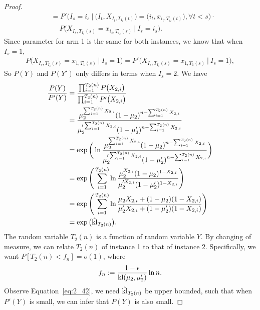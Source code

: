 \begin{proof}
\begin{equation}
\begin{split}
            &=P'\Big(I_s=i_s~\Big|~
            \big(I_t, X_{I_t, T_{I_t}(t)}\big)=\big(i_t, x_{i_t, T_{i_t}(t)}\big), \forall t<s\Big) \cdot \\
            &\quad~P\Big(X_{I_s, T_{I_s}(s)}=x_{i_s, T_{i_s}(s)}~\Big|~I_s=i_s\Big).
        \end{split}
    \end{equation}
    Since parameter for arm 1 is the same for both instances, we know that when $I_s=1$,
    \begin{align}
        P\Big(X_{I_s, T_{I_s}(s)}=x_{1, T_{1}(s)}~\Big|~I_s=1\Big) = P'\Big(X_{I_s, T_{I_s}(s)}=x_{1, T_{1}(s)}~\Big|~I_s=1\Big),
    \end{align}
    So $P(Y)$ and $P(Y')$ only differs in terms when $I_s=2$.
    We have
    \begin{align}
        \frac{P(Y)}{P'(Y)}
            &= \frac{\prod_{i=1}^{T_2(n)}P\big(X_{2, i}\big)}{\prod_{i=1}^{T_2(n)}P'\big(X_{2, i}\big)} \\
            &= \frac{\mu_2^{\sum_{i=1}^{T_2(n)} X_{2,i}}(1-\mu_2)^{n-\sum_{i=1}^{T_2(n)} X_{2,i}}}
                {\mu_2'^{\sum_{i=1}^{T_2(n)} X_{2,i}}(1-\mu_2')^{n-\sum_{i=1}^{T_2(n)} X_{2,i}}} \\
            &= \exp\bigg(\ln
                \frac{\mu_2^{\sum_{i=1}^{T_2(n)} X_{2,i}}(1-\mu_2)^{n-\sum_{i=1}^{T_2(n)} X_{2,i}}}
                {\mu_2'^{\sum_{i=1}^{T_2(n)} X_{2,i}}(1-\mu_2')^{n-\sum_{i=1}^{T_2(n)} X_{2,i}}}\bigg) \\
            &= \exp\Bigg(\sum_{i=1}^{T_2(n)} \ln
                \frac{\mu_2^{X_{2,i}}(1-\mu_2)^{1-X_{2,i}}}
                {\mu_2'^{X_{2,i}}(1-\mu_2')^{1-X_{2,i}}}\Bigg) \\
            &= \exp\Bigg(\sum_{i=1}^{T_2(n)} \ln
                \frac{\mu_2 X_{2,i} + (1-\mu_2) (1-X_{2,i})}
                {\mu_2' X_{2,i} + (1-\mu_2')(1-X_{2,i})}\Bigg) \\
            &= \exp\big(\hat{{\mathop{\mathrm{kl}}}}_{T_2(n)}\big).\label{eq:2_42}
    \end{align}
    The random variable $T_2(n)$ is a function of random variable $Y$.
    By changing of measure,
    we can relate $T_2(n)$ of instance 1 to that of instance 2.
    Specifically, we want $P[T_2(n)<f_n]=o(1)$, where
    \begin{equation}
        f_n:=\frac{1-\epsilon}{{\mathop{\mathrm{kl}}}(\mu_2,\mu_2')}\ln n.
    \end{equation}
    Observe Equation~\eqref{eq:2_42}, we need $\hat{{\mathop{\mathrm{kl}}}}_{T_2(n)}$ be upper bounded,
    such that when $P'(Y)$ is small, we can infer that $P(Y)$ is also small.

\end{proof}
